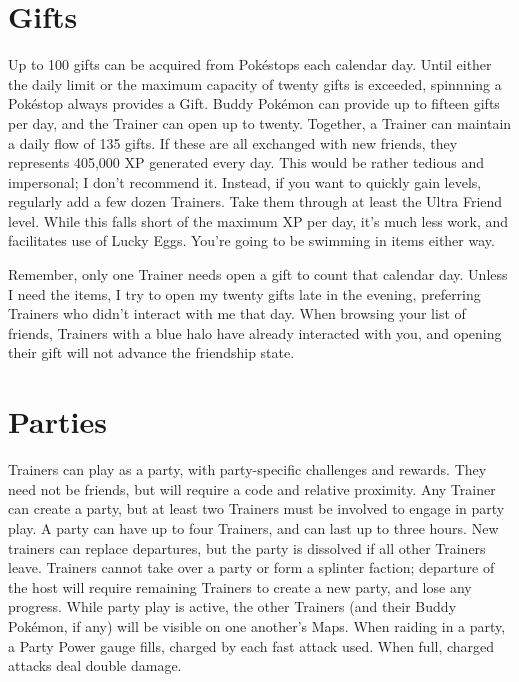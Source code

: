 \section{Gifts}
\label{sec:gifts}
Up to 100 gifts can be acquired from Pokéstops each calendar day.
Until either the daily limit or the maximum capacity of twenty gifts
 is exceeded, spinnning a Pokéstop always provides a Gift.
Buddy Pokémon can provide up to fifteen gifts per day,
  and the Trainer can open up to twenty.
Together, a Trainer can maintain a daily flow of 135 gifts.
If these are all exchanged with new friends, they represents 405,000 XP generated every day.
This would be rather tedious and impersonal; I don't recommend it.
Instead, if you want to quickly gain levels, regularly add a few dozen Trainers.
Take them through at least the Ultra Friend level.
While this falls short of the maximum XP per day, it's much less work, and facilitates use of Lucky Eggs.
You're going to be swimming in items either way.

Remember, only one Trainer needs open a gift to count that calendar day.
Unless I need the items, I try to open my twenty gifts late in the evening,
  preferring Trainers who didn't interact with me that day.
When browsing your list of friends, Trainers with a blue halo have already interacted with you,
  and opening their gift will not advance the friendship state.

\section{Parties}
\label{sec:parties}
Trainers can play as a party, with party-specific challenges and rewards.
They need not be friends, but will require a code and relative proximity.
Any Trainer can create a party, but at least two Trainers must be involved to engage in party play.
A party can have up to four Trainers, and can last up to three hours.
New trainers can replace departures, but the party is dissolved if all other Trainers leave.
Trainers cannot take over a party or form a splinter faction; departure of the host will
  require remaining Trainers to create a new party, and lose any progress.
While party play is active, the other Trainers (and their Buddy Pokémon, if any)
  will be visible on one another's Maps.
When raiding in a party, a Party Power gauge fills, charged by each fast attack used.
When full, charged attacks deal double damage.

